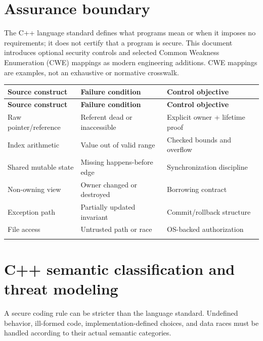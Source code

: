 \documentclass[11pt]{article}
\begin{document}
\docfront
\section{Assurance boundary}
The C++ language standard defines what programs mean or when it imposes no requirements; it does not certify that a program is secure. This document introduces optional security controls and selected Common Weakness Enumeration (CWE) mappings as modern engineering additions. CWE mappings are examples, not an exhaustive or normative crosswalk.

\small
\begin{longtable}{@{}>{\raggedright\arraybackslash}p{.22\linewidth}>{\raggedright\arraybackslash}p{.34\linewidth}>{\raggedright\arraybackslash}p{}@{}}
\toprule
\textbf{Source construct} & \textbf{Failure condition} & \textbf{Control objective}\\
\midrule
\endfirsthead
\toprule
\textbf{Source construct} & \textbf{Failure condition} & \textbf{Control objective}\\
\midrule
\endhead
Raw pointer/reference & Referent dead or inaccessible & Explicit owner + lifetime proof\\
\addlinespace[2pt]
Index arithmetic & Value out of valid range & Checked bounds and overflow\\
\addlinespace[2pt]
Shared mutable state & Missing happens-before edge & Synchronization discipline\\
\addlinespace[2pt]
Non-owning view & Owner changed or destroyed & Borrowing contract\\
\addlinespace[2pt]
Exception path & Partially updated invariant & Commit/rollback structure\\
\addlinespace[2pt]
File access & Untrusted path or race & OS-backed authorization\\
\addlinespace[2pt]
\bottomrule
\end{longtable}
\normalsize
\section{C++ semantic classification and threat modeling}
A secure coding rule can be stricter than the language standard. Undefined behavior, ill-formed code, implementation-defined choices, and data races must be handled according to their actual semantic categories.
\end{document}
